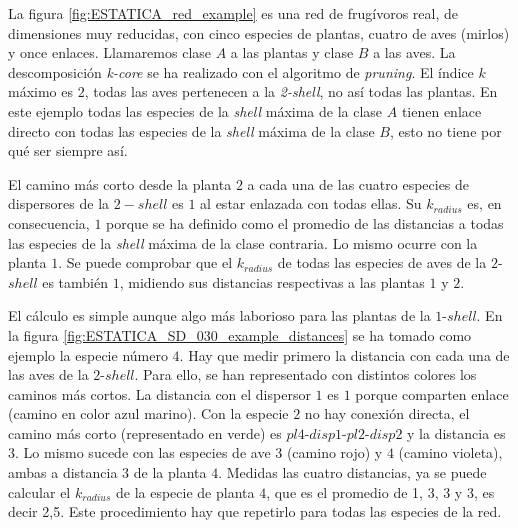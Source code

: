La figura \ref{fig:ESTATICA_red_example} es una red de frugívoros real, de dimensiones muy reducidas, con cinco especies de plantas, cuatro de aves (mirlos) y once enlaces. Llamaremos clase $A$ a las plantas y clase $B$ a las aves. La descomposición \textit{k-core} se ha realizado con el algoritmo de \textit{pruning}. El índice $k$ máximo es $2$, todas las aves pertenecen a la \textit{2-shell}, no así todas las plantas. En este ejemplo todas las especies de la \textit{shell} máxima de la clase $A$ tienen enlace directo con todas las especies de la \textit{shell} máxima de la clase $B$, esto no tiene por qué ser siempre así. 

El camino más corto desde la planta $2$ a cada una de las cuatro especies de dispersores de la $2-shell$ es $1$ al estar enlazada con todas ellas. Su $k_{radius}$ es, en consecuencia, $1$ porque se ha definido como el promedio de las distancias a todas las especies de la \textit{shell} máxima de la clase contraria. Lo mismo ocurre con la planta $1$. Se puede comprobar que el $k_{radius}$ de todas las especies de aves de la $2$-$shell$ es también $1$, midiendo sus distancias respectivas a las plantas $1$ y $2$.

El cálculo es simple aunque algo más laborioso para las plantas de la $1$-$shell$. En la figura \ref{fig:ESTATICA_SD_030_example_distances} se ha tomado como ejemplo la especie número $4$. Hay que medir primero la distancia con cada una de las aves de la $2$-$shell$. Para ello, se han representado con distintos colores los caminos más cortos. La distancia con el dispersor $1$ es $1$ porque comparten enlace (camino en color azul marino). Con la especie $2$ no hay conexión directa, el camino más corto (representado en verde) es $pl4$-$disp1$-$pl2$-$disp2$ y la distancia es $3$. Lo mismo sucede con las especies de ave $3$ (camino rojo) y $4$ (camino violeta), ambas a distancia $3$ de la planta $4$. Medidas las cuatro distancias, ya se puede calcular el $k_{radius}$ de la especie de planta $4$, que es el promedio de 1, 3, 3 y 3, es decir 2,5. Este procedimiento hay que repetirlo para todas las especies de la red.

